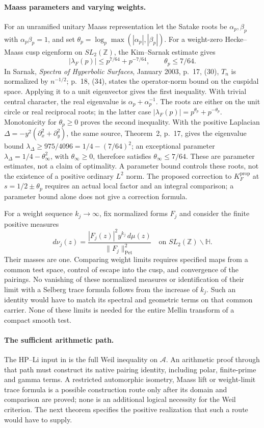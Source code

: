 \paragraph{Maass parameters and varying weights.}
\label{v4-arith:pres57:maass-weight}
For an unramified unitary Maass representation let the Satake roots
be $\alpha_p,\beta_p$ with $\alpha_p\beta_p=1$, and set
$\theta_p=\log_p\max(|\alpha_p|,|\beta_p|)$. For a weight-zero Hecke--Maass cusp eigenform on $SL_2(\mathbb Z)$,
the Kim--Sarnak estimate gives
\[
 |\lambda_F(p)|\le p^{7/64}+p^{-7/64},\qquad \theta_p\le7/64.
\]
In Sarnak, \emph{Spectra of Hyperbolic Surfaces}, January 2003,
p.~17, (30), $T_n$ is normalized by $n^{-1/2}$; p.~18, (34),
states the operator-norm bound on the cuspidal space. Applying it
to a unit eigenvector gives the first inequality. With trivial
central character, the real eigenvalue is $\alpha_p+\alpha_p^{-1}$.
The roots are either on the unit circle or real reciprocal roots;
in the latter case $|\lambda_F(p)|=p^{\theta_p}+p^{-\theta_p}$.
Monotonicity for $\theta_p\ge0$ proves the second inequality.
With the positive Laplacian $\Delta=-y^2(\partial_x^2+\partial_y^2)$,
the same source, Theorem~2, p.~17, gives the eigenvalue bound
$\lambda_\Delta\ge975/4096=1/4-(7/64)^2$; an exceptional
parameter $\lambda_\Delta=1/4-\theta_\infty^2$, with $\theta_\infty\ge0$, therefore satisfies
$\theta_\infty\le7/64$.
These are parameter estimates, not a claim of optimality.
A parameter bound controls these roots, not the existence of a
positive ordinary $L^2$ norm.
The proposed correction to $K_F^{\mathrm{prop}}$ at
$s=1/2\pm\theta_p$ requires an actual local factor and an integral
comparison; a parameter bound alone does not give a correction formula.

For a weight sequence $k_j\to\infty$, fix normalized forms $F_j$ and
consider the finite positive measures
\[
 d\nu_j(z)=\frac{|F_j(z)|^2y^{k_j}\,d\mu(z)}{\|F_j\|_{\mathrm{Pet}}^2}
 \quad\text{on }SL_2(\mathbb Z)\backslash\mathbb H.
\]
Their masses are one. Comparing weight limits requires specified
maps from a common test space, control of escape into the cusp,
and convergence of the pairings. No vanishing of these normalized
measures or identification of their limit with a Selberg trace
formula follows from the increase of $k_j$. Such an identity would
have to match its spectral and geometric terms on that common carrier.
None of these limits is needed for the entire Mellin transform of
a compact smooth test.

\paragraph{The sufficient arithmetic path.}
\label{v4-arith:pres57:sufficient-path}
The HP--Li input in  is the
full Weil inequality on $\mathscr A$. An arithmetic proof through
that path must construct its native pairing identity, including
polar, finite-prime and gamma terms. A restricted automorphic
isometry, Maass lift or weight-limit trace formula is a possible
construction route only after its domain and comparison are proved;
none is an additional logical necessity for the Weil criterion.
The next theorem specifies the positive realization that such a
route would have to supply.


